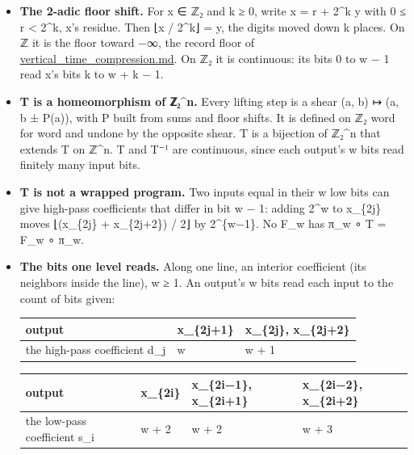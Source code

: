 \begin{itemize}
\item \textbf{The 2-adic floor shift.} For x ∈ ℤ₂ and k ≥ 0, write x = r + 2\textasciicircum{}k y with 0 ≤ r < 2\textasciicircum{}k, x's residue. Then ⌊x / 2\textasciicircum{}k⌋ = y, the digits moved down k places. On ℤ it is the floor toward −∞, the record floor of \hyperref[chap:vertical-time-compression]{vertical\_\allowbreak{}time\_\allowbreak{}compression.md}. On ℤ₂ it is continuous: its bits 0 to w − 1 read x's bits k to w + k − 1.
\item \textbf{T is a homeomorphism of ℤ₂\textasciicircum{}n.} Every lifting step is a shear (a, b) ↦ (a, b ± P(a)), with P built from sums and floor shifts. It is defined on ℤ₂ word for word and undone by the opposite shear. T is a bijection of ℤ₂\textasciicircum{}n that extends T on ℤ\textasciicircum{}n. T and T⁻¹ are continuous, since each output's w bits read finitely many input bits.
\item \textbf{T is not a wrapped program.} Two inputs equal in their w low bits can give high-pass coefficients that differ in bit w − 1: adding 2\textasciicircum{}w to x\_\allowbreak{}\{2j\} moves ⌊(x\_\allowbreak{}\{2j\} + x\_\allowbreak{}\{2j+2\}) / 2⌋ by 2\textasciicircum{}\{w−1\}. No F\_\allowbreak{}w has π\_\allowbreak{}w ∘ T = F\_\allowbreak{}w ∘ π\_\allowbreak{}w.
\item \textbf{The bits one level reads.} Along one line, an interior coefficient (its neighbors inside the line), w ≥ 1. An output's w bits read each input to the count of bits given:

{\small
\setlength{\tabcolsep}{6pt}
\begin{longtable}{>{\RaggedRight\arraybackslash}p{}>{\RaggedRight\arraybackslash}p{}>{\RaggedRight\arraybackslash}p{}}
\toprule
output & x\_\allowbreak{}\{2j+1\} & x\_\allowbreak{}\{2j\}, x\_\allowbreak{}\{2j+2\} \\
\midrule
\endhead
the high-pass coefficient d\_\allowbreak{}j & w & w + 1 \\
\bottomrule
\end{longtable}
}

{\footnotesize
\setlength{\tabcolsep}{6pt}
\begin{longtable}{>{\RaggedRight\arraybackslash}p{}>{\RaggedRight\arraybackslash}p{}>{\RaggedRight\arraybackslash}p{}>{\RaggedRight\arraybackslash}p{}}
\toprule
output & x\_\allowbreak{}\{2i\} & x\_\allowbreak{}\{2i−1\}, x\_\allowbreak{}\{2i+1\} & x\_\allowbreak{}\{2i−2\}, x\_\allowbreak{}\{2i+2\} \\
\midrule
\endhead
the low-pass coefficient s\_\allowbreak{}i & w + 2 & w + 2 & w + 3 \\
\bottomrule
\end{longtable}
}


\end{itemize}
